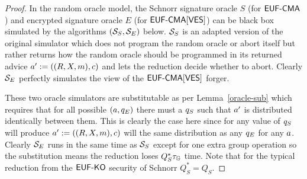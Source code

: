 \begin{proof}

  In the random oracle model, the Schnorr signature oracle $S$ (for $\textsf{EUF-CMA}$) and encrypted signature oracle $E$ (for $\textsf{EUF-CMA}[\textsf{VES}]$) can be black box simulated by the algorithms $(\mathcal{S}_S, \mathcal{S}_E)$ below.
  $\mathcal{S}_S$ is an adapted version of the original simulator which does not program the random oracle or abort itself but rather returns how the random oracle should be programmed in its returned advice $a' := ((R,X,m),c)$ and lets the reduction decide whether to abort.
  Clearly $\mathcal{S}_E$ perfectly simulates the view of the $\textsf{EUF-CMA}[\textsf{VES}]$ forger.

  \begin{center}
  \end{center}

  These two oracle simulators are substitutable as per Lemma~\ref{oracle-sub} which requires that for all possible $(a, q_E)$ there must a $q_S$ such that $a'$ is distributed identically between them.
  This is clearly the case here since for any value of $q_S$ will produce $a' := ((R,X,m), c)$ will the same distribution as any $q_E$ for any $a$.
  Clearly $\mathcal{S}_E$ runs in the same time as $\mathcal{S}_S$ except for one extra group operation so the substitution means the reduction loses $Q_S^*\tau_{\mathbb{G}}$ time.
  Note that for the typical reduction\cite{pointcheval2000security} from the $\textsf{EUF-KO}$ security of Schnorr $Q_S^* = Q_S$.
\end{proof}
